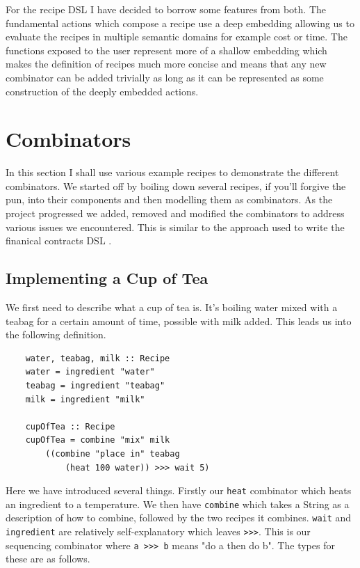 \documentclass[11pt]{article}
\begin{document}
\medbreak

For the recipe DSL I have decided to borrow some features from
both. The fundamental actions which compose a recipe use a
deep embedding allowing us to evaluate the recipes in multiple
semantic domains for example cost or time. The functions
exposed to the user represent more of a shallow embedding
which makes the definition of recipes much more concise and
means that any new combinator can be added trivially as long
as it can be represented as some construction of the deeply
embedded actions.

\section{Combinators}

In this section I shall use various example recipes to demonstrate
the different combinators. We started off by boiling down several
recipes, if you'll forgive the pun, into their components and
then modelling them as combinators. As the project progressed
we added, removed and modified the combinators to address
various issues we encountered. This is similar to the approach
used to write the finanical contracts DSL \cite{contracts}.

\subsection{Implementing a Cup of Tea}

We first need to describe what a cup of tea is. It's boiling water
mixed with a teabag for a certain amount of time, possible with milk added.
This leads us into the following definition.

\begin{lstlisting}
    water, teabag, milk :: Recipe
    water = ingredient "water"
    teabag = ingredient "teabag"
    milk = ingredient "milk"

    cupOfTea :: Recipe
    cupOfTea = combine "mix" milk
        ((combine "place in" teabag
            (heat 100 water)) >>> wait 5)
\end{lstlisting}

Here we have introduced several things. Firstly our \texttt{heat} combinator which heats an
ingredient to a temperature. We then have \texttt{combine} which takes a String as a description
of how to combine, followed by the two recipes it combines. \texttt{wait} and \texttt{ingredient} are
relatively self-explanatory which leaves \texttt{>>>}. This is our sequencing combinator
where \texttt{a >>> b} means "do a then do b". The types for these are as follows.
\end{document}
